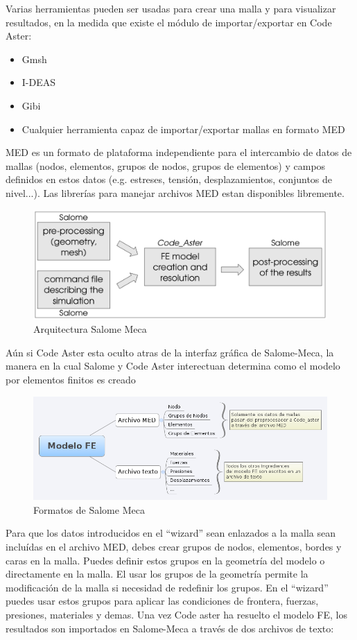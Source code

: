 \documentclass[12pt]{book}
\theoremstyle{definition}
\theoremstyle{remark}
\theoremstyle{plain}
\begin{document}
Varias herramientas pueden ser usadas para crear una malla y para 
visualizar resultados, en la medida que existe el módulo de importar/exportar 
en Code Aster:
\begin{itemize}
 \item Gmsh
 \item I-DEAS
 \item Gibi
 \item Cualquier herramienta capaz de importar/exportar mallas en formato MED
\end{itemize}

MED es un formato de plataforma independiente para el intercambio de datos de mallas
(nodos, elementos, grupos de nodos, grupos de elementos) y campos definidos en estos 
datos (e.g. estreses, tensión, desplazamientos, conjuntos de nivel...). Las 
librerías para manejar archivos MED estan disponibles libremente. 

\begin{figure}
\centering
\includegraphics[width=5in]{SalomeMeca.png}
\caption{Arquitectura Salome Meca}
\label{fig2}
\end{figure}
Aún si Code Aster esta oculto atras de la interfaz gráfica de Salome-Meca, la manera 
en la cual Salome y Code Aster interectuan determina como el modelo por elementos
finitos es creado

\begin{figure}
\centering
\includegraphics[width=5.5in]{ModeloFE.png}
\caption{Formatos de Salome Meca}
\label{fig3}
\end{figure}

Para que los datos introducidos en el ``wizard'' sean enlazados a la malla sean 
incluídas en el archivo MED, debes crear grupos de nodos, elementos, bordes y caras 
en la malla. Puedes definir estos grupos en la geometría del modelo o directamente 
en la malla. El usar los grupos de la geometría permite la modificación de la malla
si necesidad de redefinir los grupos. En el ``wizard'' puedes usar estos grupos para
aplicar las condiciones de frontera, fuerzas, presiones, materiales y demas.
Una vez Code aster ha resuelto el modelo FE, los resultados son importados en 
Salome-Meca a través de dos archivos de texto:
\end{document}
